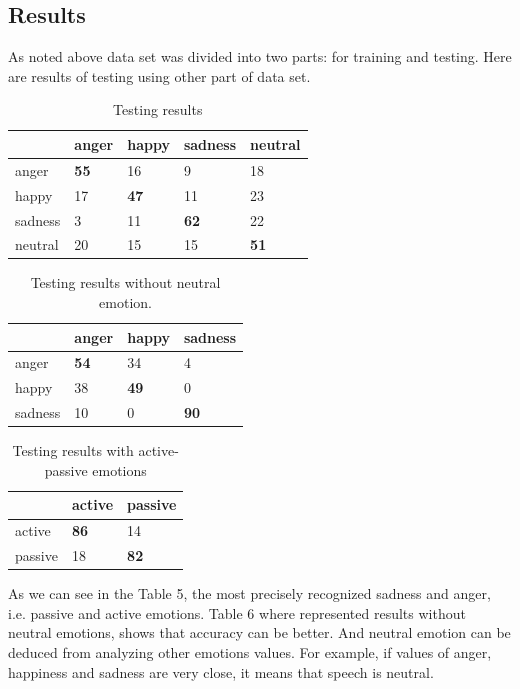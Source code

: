 \documentclass[14pt]{extarticle}
\begin{document}
\subsection{Results}
As noted above data set was divided into two parts: for training and testing. Here are results of testing using other part of data set.\\
\begin{table}[h]
	\centering
	\begin{tabular}{|l|l|l|l|l|}
		\hline
		&anger&happy&sadness&neutral\\ \hline
		anger&\textbf{55}&16&9&18\\\hline
		happy & 17 & \textbf{47} & 11 & 23 \\\hline
		sadness & 3 & 11 & \textbf{62} & 22\\\hline
		neutral & 20 & 15 & 15 & \textbf{51}\\\hline
		
	\end{tabular}
	\caption{Testing results}
\end{table}
\begin{table}[h]
	\centering
	\begin{tabular}{|l|l|l|l|}
		\hline
		&anger&happy&sadness\\ \hline
		anger&\textbf{54}&34&4\\\hline
		happy & 38 & \textbf{49} & 0\\\hline
		sadness & 10 & 0& \textbf{90}\\\hline
		
	\end{tabular}
	\caption{Testing results without neutral emotion.}
\end{table}
\begin{table}[h]
	\centering
	\begin{tabular}{|l|l|l|}
		\hline
		& active & passive\\ \hline
		active & \textbf{86} & 14\\\hline
		passive & 18 & \textbf{82}\\\hline
		
	\end{tabular}
	\caption{Testing results with active-passive emotions}
\end{table}
As we can see in the Table 5, the most precisely recognized sadness and anger, i.e. passive and active emotions. Table 6 where represented results without neutral emotions, shows that accuracy can be better. And neutral emotion can be deduced from analyzing other emotions values. For example, if values of anger, happiness and sadness are very close, it means that speech is neutral.
\end{document}
